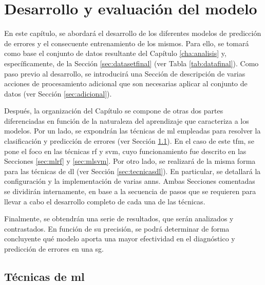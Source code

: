 \chapter{Desarrollo y evaluación del modelo}
\label{cha:desarrollo}

En este capítulo, se abordará el desarrollo de los diferentes modelos de predicción de errores y el consecuente entrenamiento de los mismos. Para ello, se tomará como base el conjunto de datos resultante del Capítulo \ref{cha:analisis} y, específicamente, de la Sección \ref{sec:datasetfinal} (ver Tabla \ref{tab:datafinal}). Como paso previo al desarrollo, se introducirá una Sección de descripción de varias acciones de procesamiento adicional que son necesarias aplicar al conjunto de datos (ver Sección \ref{sec:adicional}).

\vspace{3mm}

Después, la organización del Capítulo se compone de otras dos partes diferenciadas en función de la naturaleza del aprendizaje que caracteriza a los modelos. Por un lado, se expondrán las técnicas de \gls{ml} empleadas para resolver la clasificación y predicción de errores (ver Sección \ref{sec:tecnicasml}). En el caso de este \gls{tfm}, se pone el foco en las técnicas \gls{rf} y \gls{svm}, cuyo funcionamiento fue descrito en las Secciones \ref{sec:mlrf} y \ref{sec:mlsvm}. Por otro lado, se realizará de la misma forma para las técnicas de \gls{dl} (ver Sección \ref{sec:tecnicasdl}). En particular, se detallará la configuración y la implementación de varias \gls{ann}s. Ambas Secciones comentadas se dividirán internamente, en base a la secuencia de pasos que se requieren para llevar a cabo el desarrollo completo de cada una de las técnicas.

\vspace{3mm}

Finalmente, se obtendrán una serie de resultados, que serán analizados y contrastados. En función de su precisión, se podrá determinar de forma concluyente qué modelo aporta una mayor efectividad en el diagnóstico y predicción de errores en una \gls{sg}.



\section{Técnicas de \gls{ml}}
\label{sec:tecnicasml}

